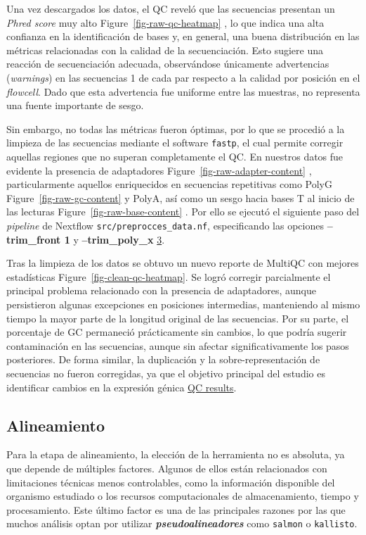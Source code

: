 \documentclass[
  9pt,
]{article}
\begin{document}
Una vez descargados los datos, el QC reveló que las secuencias presentan
un \emph{Phred score} muy alto Figure~\ref{fig-raw-qc-heatmap} , lo que
indica una alta confianza en la identificación de bases y, en general,
una buena distribución en las métricas relacionadas con la calidad de la
secuenciación. Esto sugiere una reacción de secuenciación adecuada,
observándose únicamente advertencias (\emph{warnings}) en las secuencias
1 de cada par respecto a la calidad por posición en el \emph{flowcell}.
Dado que esta advertencia fue uniforme entre las muestras, no representa
una fuente importante de sesgo.

Sin embargo, no todas las métricas fueron óptimas, por lo que se
procedió a la limpieza de las secuencias mediante el software
\texttt{fastp}, el cual permite corregir aquellas regiones que no
superan completamente el QC. En nuestros datos fue evidente la presencia
de adaptadores Figure~\ref{fig-raw-adapter-content} , particularmente
aquellos enriquecidos en secuencias repetitivas como PolyG
Figure~\ref{fig-raw-gc-content} y PolyA, así como un sesgo hacia bases T
al inicio de las lecturas Figure~\ref{fig-raw-base-content} . Por ello
se ejecutó el siguiente paso del \emph{pipeline} de Nextflow
\texttt{src/preprocces\_data.nf}, especificando las opciones
\textbf{--trim\_front 1} y \textbf{--trim\_poly\_x}
\hyperref[section-2]{3}.

Tras la limpieza de los datos se obtuvo un nuevo reporte de MultiQC con
mejores estadísticas Figure~\ref{fig-clean-qc-heatmap}. Se logró
corregir parcialmente el principal problema relacionado con la presencia
de adaptadores, aunque persistieron algunas excepciones en posiciones
intermedias, manteniendo al mismo tiempo la mayor parte de la longitud
original de las secuencias. Por su parte, el porcentaje de GC permaneció
prácticamente sin cambios, lo que podría sugerir contaminación en las
secuencias, aunque sin afectar significativamente los pasos posteriores.
De forma similar, la duplicación y la sobre-representación de secuencias
no fueron corregidas, ya que el objetivo principal del estudio es
identificar cambios en la expresión génica \href{QC_res}{QC results}.

\subsection{Alineamiento}\label{alineamiento}

Para la etapa de alineamiento, la elección de la herramienta no es
absoluta, ya que depende de múltiples factores. Algunos de ellos están
relacionados con limitaciones técnicas menos controlables, como la
información disponible del organismo estudiado o los recursos
computacionales de almacenamiento, tiempo y procesamiento. Este último
factor es una de las principales razones por las que muchos análisis
optan por utilizar \textbf{\emph{pseudoalineadores}} como
\texttt{salmon} o \texttt{kallisto}.
\end{document}
